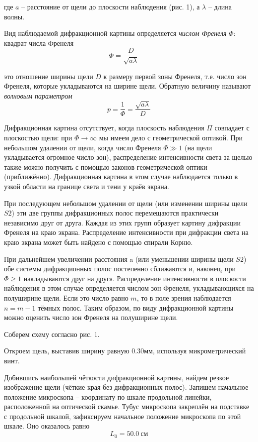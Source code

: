 \documentclass[14pt]{article}
\begin{document}
где
$a$ -- расстояние от щели до плоскости наблюдения (рис. 1), а $\lambda$ -- длина волны.

Вид наблюдаемой дифракционной картины определяется \textsl{числом Френеля} $\Phi$: квадрат числа Френеля
$$
	\Phi = \frac{D}{\sqrt{a\lambda}} ~-
$$

это отношение ширины щели $D$ к размеру первой зоны Френеля, т.е. число зон Френеля, которые укладываются на ширине щели. Обратную величину называют \textsl{волновым параметром}
$$
	p = \frac{1}{\Phi} = \frac{\sqrt{a\lambda}}{D}
$$

Дифракционная картина отсутствует, когда плоскость наблюдения $\Pi$ совпадает с плоскостью щели: при $\Phi \rightarrow \infty$ мы имеем дело с геометрической оптикой. При небольшом удалении от щели, когда число Френеля $\Phi \gg 1$ (на щели укладывается огромное число зон), распределение интенсивности света за щелью также можно получить с помощью законов геометрической оптики (приближённо). Дифракционная картина в этом случае наблюдается только в узкой области на границе света и тени у краёв экрана.

При последующем небольшом удалении от щели (или изменении ширины щели $S2$) эти две группы дифракционных полос перемещаются практически независимо друг от друга. Каждая из этих групп образует картину дифракции Френеля на краю экрана. Распределение интенсивности при дифракции света на краю экрана может быть найдено с помощью спирали Корню. 

При дальнейшем увеличении расстояния a (или уменьшении ширины щели $S2$) обе системы дифракционных полос постепенно сближаются и, наконец, при $\Phi \geq 1$ накладываются друг на друга. Распределение интенсивности в плоскости наблюдения в этом случае определяется числом зон Френеля, укладывающихся на полуширине щели. Если это число равно $m$, то в поле зрения наблюдается $n = m - 1$ тёмных полос. Таким образом, по виду дифракционной картины можно оценить число зон Френеля на полуширине щели.

\vspace{1cm}
Соберем схему согласно рис. 1.

Откроем щель, выставив ширину равную 0.30мм, используя микрометрический винт.

Добившись наибольшей чёткости дифракционной картины, найдем резкое изображение щели (чёткие края без дифракционных полос). Запишем начальное положение микроскопа -- координату по шкале продольной линейки, расположенной на оптической скамье. Тубус микроскопа закреплён на подставке с продольной шкалой, зафиксируем начальное положение микроскопа по этой шкале. Оно оказалось равно
$$
	L_0 = 50.0~\text{см}
$$
\end{document}
